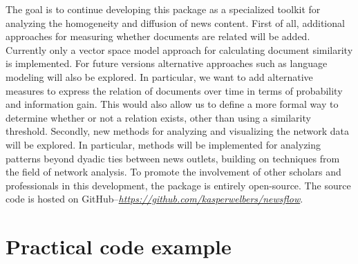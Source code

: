 \documentclass[]{article}
\begin{document}
The goal is to continue developing this package as a specialized toolkit
for analyzing the homogeneity and diffusion of news content. First of
all, additional approaches for measuring whether documents are related
will be added. Currently only a vector space model approach for
calculating document similarity is implemented. For future versions
alternative approaches such as language modeling will also be explored.
In particular, we want to add alternative measures to express the
relation of documents over time in terms of probability and information
gain. This would also allow us to define a more formal way to determine
whether or not a relation exists, other than using a similarity
threshold. Secondly, new methods for analyzing and visualizing the
network data will be explored. In particular, methods will be
implemented for analyzing patterns beyond dyadic ties between news
outlets, building on techniques from the field of network analysis. To
promote the involvement of other scholars and professionals in this
development, the package is entirely open-source. The source code is
hosted on
GitHub--\emph{\url{https://github.com/kasperwelbers/newsflow}}.

\section{Practical code example}\label{practical-code-example}
\end{document}
